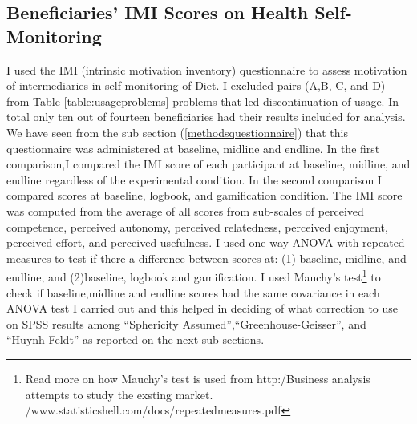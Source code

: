 \subsection{Beneficiaries' IMI Scores on Health Self-Monitoring}
I used the IMI (intrinsic motivation inventory) questionnaire to assess motivation of intermediaries in self-monitoring of Diet. I excluded pairs (A,B, C, and D) from Table \ref{table:usageproblems} problems that led discontinuation of usage. In total only ten out of fourteen beneficiaries had their results included for analysis. We have seen from the sub section (\ref{methodsquestionnaire}) that this questionnaire was administered at baseline, midline and endline.\newline
In the first comparison,I compared the IMI score of each participant at baseline, midline, and endline regardless of the experimental condition. In the second comparison I compared scores at baseline, logbook, and gamification condition. The IMI score was computed from the average of all scores from sub-scales of perceived competence, perceived autonomy, perceived relatedness, perceived enjoyment, perceived effort,  and perceived usefulness. I  used one way ANOVA with repeated measures to test if there a difference  between scores at: (1) baseline, midline, and endline, and (2)baseline, logbook and gamification. I used Mauchy's test\footnote{Read more on how Mauchy's test is used from http:/Business analysis attempts to study the exsting market. /www.statisticshell.com/docs/repeatedmeasures.pdf} to check if baseline,midline and endline scores had the same covariance in each ANOVA test I carried out and this helped in deciding of what correction to use on SPSS results among ``Sphericity Assumed'',``Greenhouse-Geisser'', and ``Huynh-Feldt'' as reported on the next sub-sections.
